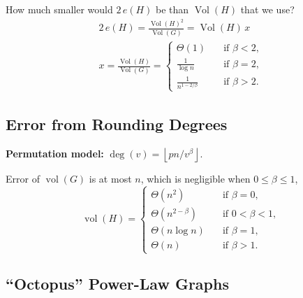 \documentclass{beamer}
\newcommand{\floor}[1]{{\left\lfloor{#1}\right\rfloor}}
\DeclareMathOperator*{\vol}{vol}
\DeclareMathOperator*{\Vol}{Vol}
\newcommand{\autotitle}{\secname\ifdefempty{\subsecname}{}{~--- \subsecname}}
\begin{document}
\begin{frame}{\autotitle}
    How much smaller would $2\,e(H)$ be than $\Vol(H)$ that we use?
    \begin{gather*}
        2\,e(H)=\frac{\Vol(H)^2}{\Vol(G)}=\Vol(H)\,x\\
        x=\frac{\Vol(H)}{\Vol(G)}=
        \begin{cases}
            \Theta(1) & \quad \text{if } \beta<2,\\
            \frac{1}{\log n} & \quad \text{if } \beta=2,\\
            \frac{1}{n^{1-2/\beta}} & \quad \text{if } \beta>2.
        \end{cases}
    \end{gather*}
\end{frame}

\subsection{Error from Rounding Degrees}

\begin{frame}{\autotitle}
    \textbf{Permutation model:} $\deg(v)=\floor{pn/v^\beta}$.
    
    Error of $\vol(G)$ is at most $n$, which is negligible when $0\leq\beta\leq 1$,
    \begin{equation*}
        \vol(H)=
        \begin{cases}
            \Theta\left(n^2\right) & \quad \text{if } \beta=0,\\
            \Theta\left(n^{2-\beta}\right) & \quad \text{if } 0<\beta<1,\\
            \Theta(n \log n) & \quad \text{if } \beta=1,\\
            \Theta(n) & \quad \text{if } \beta>1.
        \end{cases}
    \end{equation*}
\end{frame}

\subsection{\texorpdfstring{``Octopus''}{"Octopus"} Power-Law Graphs}
\end{document}

